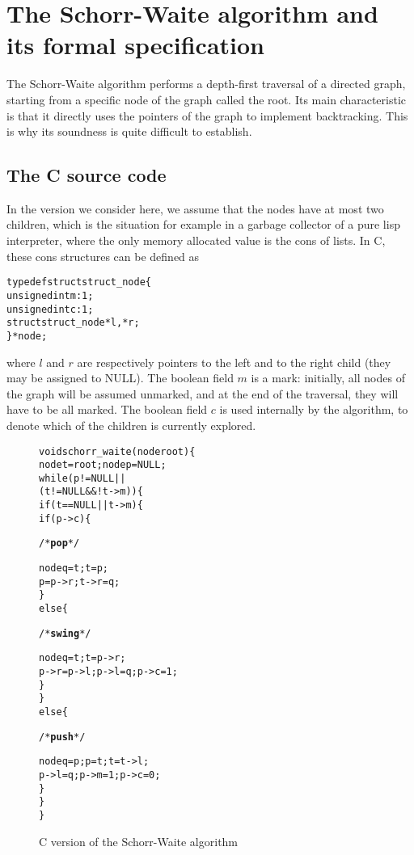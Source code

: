 
\section{The Schorr-Waite algorithm and its formal specification}
\label{sec:algo}

The Schorr-Waite algorithm performs a depth-first traversal of a
directed graph, starting from a specific node of the graph called the
root. Its main characteristic is that it directly uses the pointers of
the graph to implement backtracking. This is why its soundness is
quite difficult to establish. 

\subsection{The C source code}

In the version we consider here, we assume that the nodes have
at most two children, which is the situation for example in a garbage
collector of a pure lisp interpreter, where the only memory allocated
value is the \textsf{cons} of lists. In C, these \textsf{cons}
structures can be defined as
\begin{alltt}
typedef struct struct_node \{
  unsigned int m :1;
  unsigned int c :1;
  struct struct_node *l, *r;
\} * node;
\end{alltt}
where $l$ and $r$ are respectively pointers to the left and to the
right child (they may be assigned to NULL). The boolean field $m$ is a
mark: initially, all nodes of the graph will be assumed unmarked, and
at the end of the traversal, they will have to be all marked. The
boolean field $c$ is used internally by the algorithm, to denote which
of the children is currently explored.
 
\begin{figure}[b]
\begin{alltt}
void schorr_waite(node root) \{
  node t = root; node p = NULL;
  while (p != NULL || 
        (t != NULL && ! t->m)) \{
    if (t == NULL || t->m) \{
      if (p->c) \{ \begin{slshape}/* \textbf{pop} */\end{slshape}
        node q = t; t = p; 
        p = p->r; t->r = q;
      \} 
      else \{ \begin{slshape}/* \textbf{swing} */\end{slshape}
        node q = t; t = p->r; 
        p->r = p->l; p->l = q; p->c = 1;
      \}
    \} 
    else \{ \begin{slshape}/* \textbf{push} */ \end{slshape}
      node q = p; p = t; t = t->l; 
      p->l = q; p->m = 1; p->c = 0;
    \}
  \}
\}
\end{alltt}
\caption{C version of the Schorr-Waite algorithm}
\label{fig:code}
\end{figure}

